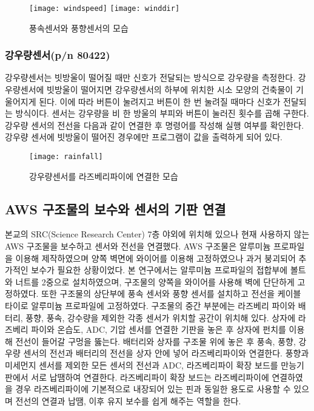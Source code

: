 \begin{figure}[htbp]
	\centering
	\texttt{[image: windspeed]}
	\texttt{[image: winddir]}
	\caption{풍속센서와 풍향센서의 모습}
	\label{WIND}
\end{figure}

\subsubsection{강우량센서(p/n 80422)}
강우량센서는 빗방울이 떨어질 때만 신호가 전달되는 방식으로 강우량을 측정한다. 강우량센서에 빗방울이 떨어지면 강우량센서의 하부에 위치한 시소 모양의 건축물이 기울어지게 된다. 이에 따라 버튼이 눌려지고 버튼이 한 번 눌려질 때마다 신호가 전달되는 방식이다. 센서는 강우량을 비 한 방울의 부피와 버튼이 눌러진 횟수를 곱해 구한다. 강우량 센서의 전선을 다음과 같이 연결한 후 명령어를 작성해 실행 여부를 확인한다. 강우량 센서에 빗방울이 떨어진 경우에만 프로그램이 값을 출력하게 되어 있다.

\begin{figure}[htbp]
	\centering
	\texttt{[image: rainfall]}
	\caption{강우량센서를 라즈베리파이에 연결한 모습}
	\label{RAINFALL}
\end{figure}

\subsection{AWS 구조물의 보수와 센서의 기판 연결}
본교의 SRC(Science Research Center) 7층 야외에 위치해 있으나 현재 사용하지 않는 AWS 구조물을 보수하고 센서와 전선을 연결했다. AWS 구조물은 알루미늄 프로파일을 이용해 제작하였으며 양쪽 벽면에 와이어를 이용해 고정하였으나 과거 붕괴되어 추가적인 보수가 필요한 상황이었다. 본 연구에서는 알루미늄 프로파일의 접합부에 볼트와 너트를 2중으로 설치하였으며, 구조물의 양쪽을 와이어를 사용해 벽에 단단하게 고정하였다. 또한 구조물의 상단부에 풍속 센서와 풍향 센서를 설치하고 전선을 케이블 타이로 알루미늄 프로파일에 고정하였다. 구조물의 중간 부분에는 라즈베리 파이와 배터리, 풍향, 풍속, 강수량을 제외한 각종 센서가 위치할 공간이 위치해 있다. 상자에 라즈베리 파이와 온습도, ADC, 기압 센서를 연결한 기판을 놓은 후 상자에 펀치를 이용해 전선이 들어갈 구멍을 뚫는다. 배터리와 상자를 구조물 위에 놓은 후 풍속, 풍향, 강우량 센서의 전선과 배터리의 전선을 상자 안에 넣어 라즈베리파이와 연결한다.
풍향과 미세먼지 센서를 제외한 모든 센서의 전선과 ADC, 라즈베리파이 확장 보드를 만능기판에서 서로 납땜하여 연결한다. 라즈베리파이 확장 보드는 라즈베리파이에 연결하였을 경우 라즈베리파이에 기본적으로 내장되어 있는 핀과 동일한 용도로 사용할 수 있으며 전선의 연결과 납땜, 이후 유지 보수를 쉽게 해주는 역할을 한다.

